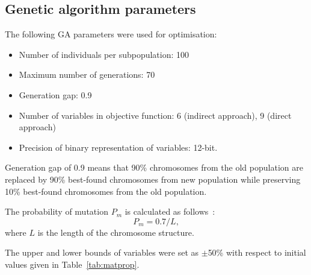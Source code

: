 \documentclass[preprint,12pt]{elsarticle}
\begin{document}
	\subsection{Genetic algorithm parameters}
	The following GA parameters were used for optimisation:
	\begin{itemize}
		\item Number of individuals per subpopulation: 100
		\item Maximum number of generations: 70
		\item Generation gap: 0.9
		\item Number of variables in objective function: 6 (indirect approach), 9 (direct approach)
		\item Precision of binary representation of variables: 12-bit.
   \end{itemize}
    Generation gap of 0.9 means that 90\% chromosomes from the old population are replaced by 90\% best-found chromosomes from new population while preserving 10\% best-found chromosomes from the old population.
    
    The probability of mutation \(P_m\) is calculated as follows~\cite{Chipperfield1994}:
    \begin{equation}
    	P_m = 0.7/L,
    \end{equation}
    where \(L\) is the length of the chromosome structure.
    
	The upper and lower bounds of variables were set as \(\pm\)50\% with respect to initial values given in Table~\ref{tab:matprop}.
\end{document}
